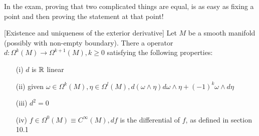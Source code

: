In the exam, proving that two complicated things are equal, is as easy as fixing a point and then proving the statement at that point! %

\begin{theorem}\label{thm:10.13}[Existence and uniqueness of the exterior derivative]
    Let \(M\) be a smooth manifold (possibly with non-empty boundary). There  a  operator 
    \(d:\Omega^k(M)\to \Omega^{k+1}(M),k\geq 0\) satisfying the following properties:
    \begin{enumerate}
        \item[(i)] \(d\) is \(\mathbb{R}\) linear 
        \item[(ii)] given \(\omega\in\Omega^k(M),\eta\in\Omega^l(M), d(\omega\wedge \eta)d\omega\wedge \eta+ (-1)^k\omega \wedge d\eta\)
        \item[(iii)] \(d^2=0\)
        \item[(iv)] \(f\in \Omega^0(M)\equiv C^\infty(M),df\) is the differential of \(f\), as defined in section 10.1 %
    \end{enumerate}
\end{theorem}

